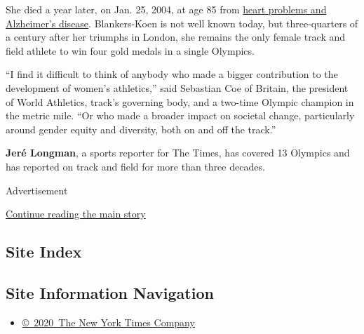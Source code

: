 She died a year later, on Jan. 25, 2004, at age 85 from
\href{https://www.nytimes3xbfgragh.onion/2004/01/26/sports/fanny-blankers-koen-star-of-48-olympics-dies-at-85.html}{heart
problems and Alzheimer's disease}. Blankers-Koen is not well known
today, but three-quarters of a century after her triumphs in London, she
remains the only female track and field athlete to win four gold medals
in a single Olympics.

``I find it difficult to think of anybody who made a bigger contribution
to the development of women's athletics,'' said Sebastian Coe of
Britain, the president of World Athletics, track's governing body, and a
two-time Olympic champion in the metric mile. ``Or who made a broader
impact on societal change, particularly around gender equity and
diversity, both on and off the track.''

\textbf{Jeré Longman}, a sports reporter for The Times, has covered 13
Olympics and has reported on track and field for more than three
decades.

Advertisement

\protect\hyperlink{after-bottom}{Continue reading the main story}

\hypertarget{site-index}{%
\subsection{Site Index}\label{site-index}}

\hypertarget{site-information-navigation}{%
\subsection{Site Information
Navigation}\label{site-information-navigation}}

\begin{itemize}
\tightlist
\item
  \href{https://help.nytimes3xbfgragh.onion/hc/en-us/articles/115014792127-Copyright-notice}{©~2020~The
  New York Times Company}
\end{itemize}

